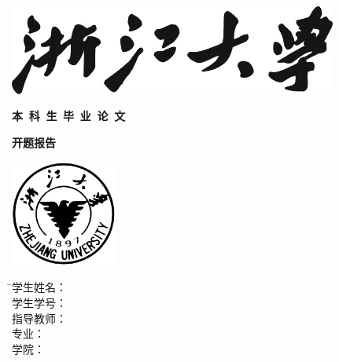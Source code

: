 
\thispagestyle{empty}

\vspace{5mm}

\begin{center}
   \includegraphics[width=108mm]{images/zjdx}
\end{center}

\centerline{\songti\erhao\textbf{本\, 科\, 生\, 毕\, 业\, 论\, 文}}
\vspace{1.5mm}
\centerline{\songti\erhao\textbf{开题报告}}
\vspace{4mm}

\begin{center}
  \includegraphics[width=35mm]{images/standxb}
\end{center}

\vspace{32mm}

\begin{tabbing}
               \hspace{30mm} \= \songti\sihao 学生姓名： \= \underline{\makebox[6cm]{\sihao\zjuauthornamec}} \\[2mm]
              \> \songti\sihao 学生学号： \> \underline{\makebox[6cm]{\sihao\zjuauthorid}} \\[2mm]
              \> \songti\sihao 指导教师： \> \underline{\makebox[6cm]{\sihao\zjumentorc}} \\[2mm]
              \> \songti\sihao 专\hspace{10mm}业： \> \underline{\makebox[6cm]{\sihao\zjugrade\hspace{3mm}\zjumajor}} \\[2mm]
              \> \songti\sihao 学\hspace{10mm}院： \> \underline{\makebox[6cm]{\sihao\zjucollegec}}
\end{tabbing}


